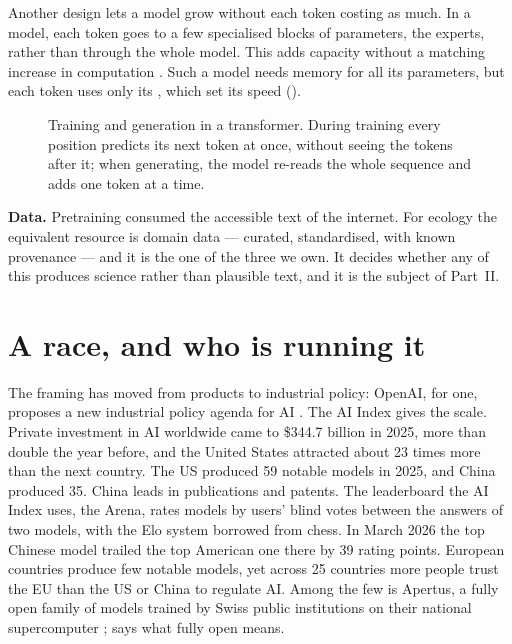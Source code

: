 Another design lets a model grow without each token costing as much. In a
 model, each token goes to a few specialised blocks
of parameters, the experts, rather than through the whole model. This adds
capacity without a matching increase in computation
\parencite{coqueret2026randomness,elsworth2025google}. Such a model needs
memory for all its parameters, but each token uses only its , which set its speed ().

\begin{figure}[htbp]
\centering
{}
\caption{Training and generation in a transformer. During training every
position predicts its next token at once, without seeing the tokens after it;
when generating, the model re-reads the whole sequence and adds one token at a
time.}
\label{fig:parallel}
\end{figure}

\textbf{Data.} Pretraining consumed the accessible text of the internet. For
ecology the equivalent resource is domain data --- curated, standardised, with
known provenance --- and it is the one of the three we own. It decides whether
any of this produces science rather than plausible text, and it is the subject
of Part~II.

\section{A race, and who is running it}

The framing has moved from products to industrial policy: OpenAI, for one,
proposes a new industrial policy agenda for AI
\parencite{openai2026industrialpolicy}. The AI Index \parencite{aiindex2026}
gives the scale. Private investment in AI worldwide came to \$344.7 billion in
2025, more than double the year before, and the United States attracted about
23 times more than the next country. The US produced 59 notable models in 2025,
and China produced 35. China leads in publications and patents. The leaderboard
the AI Index uses, the Arena, rates models by users' blind votes between the
answers of two models, with the Elo system borrowed from chess. In March 2026
the top Chinese model trailed the top American one there by 39 rating points.
European countries produce few notable models, yet across 25 countries more
people trust the EU than the US or China to regulate AI. Among the few is
Apertus, a fully open family of models trained by Swiss public institutions on
their national supercomputer \parencite{apertus2026report};
 says what fully open means.

